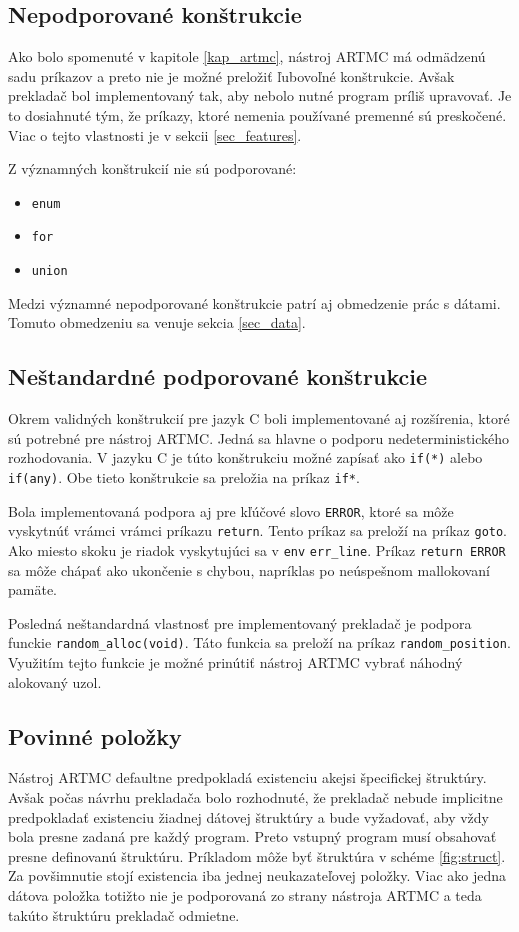 \subsection{Nepodporované konštrukcie}
Ako bolo spomenuté v kapitole \ref{kap_artmc}, nástroj ARTMC má odmädzenú sadu príkazov a preto nie je možné preložiť ľubovoľné konštrukcie. Avšak prekladač bol implementovaný tak, aby nebolo nutné program príliš upravovať. Je to dosiahnuté tým, že príkazy, ktoré nemenia používané premenné sú preskočené. Viac o tejto vlastnosti je v sekcii \ref{sec_features}.

Z významných konštrukcií nie sú podporované:
\begin{itemize}
\item \texttt{enum}
\item \texttt{for}
\item \texttt{union}
\end{itemize}

Medzi významné nepodporované konštrukcie patrí aj obmedzenie prác s dátami. Tomuto obmedzeniu sa venuje sekcia \ref{sec_data}.

\subsection{Neštandardné podporované konštrukcie}
Okrem validných konštrukcií pre jazyk C boli implementované aj rozšírenia, ktoré sú potrebné pre nástroj ARTMC. Jedná sa hlavne o podporu nedeterministického rozhodovania. V jazyku C je túto konštrukciu možné zapísať ako \texttt{if(*)} alebo \texttt{if(any)}. Obe tieto konštrukcie sa preložia na príkaz \texttt{if*}.

Bola implementovaná podpora aj pre kľúčové slovo \texttt{ERROR}, ktoré sa môže vyskytnúť vrámci vrámci príkazu \texttt{return}. Tento príkaz sa preloží na príkaz \texttt{goto}. Ako miesto skoku je riadok vyskytujúci sa v \texttt{env} \texttt{err\_line}. Príkaz \texttt{return ERROR} sa môže chápať ako ukončenie s chybou, napríklas po neúspešnom mallokovaní pamäte.

Posledná neštandardná vlastnosť pre implementovaný prekladač je podpora funckie \texttt{random\_alloc(void)}. Táto funkcia sa preloží na príkaz \texttt{random\_position}. Využitím tejto funkcie je možné prinútiť nástroj ARTMC vybrať náhodný alokovaný uzol.

\subsection{Povinné položky}
Nástroj ARTMC defaultne predpokladá existenciu akejsi špecifickej štruktúry. Avšak počas návrhu prekladača bolo rozhodnuté, že prekladač nebude implicitne predpokladať existenciu žiadnej dátovej štruktúry a bude vyžadovať, aby vždy bola presne zadaná pre každý program. Preto vstupný program musí obsahovať presne definovanú štruktúru. Príkladom môže byť štruktúra v schéme \ref{fig:struct}. Za povšimnutie stojí existencia iba jednej neukazateľovej položky. Viac ako jedna dátova položka totižto nie je podporovaná zo strany nástroja ARTMC a teda takúto štruktúru prekladač odmietne.

